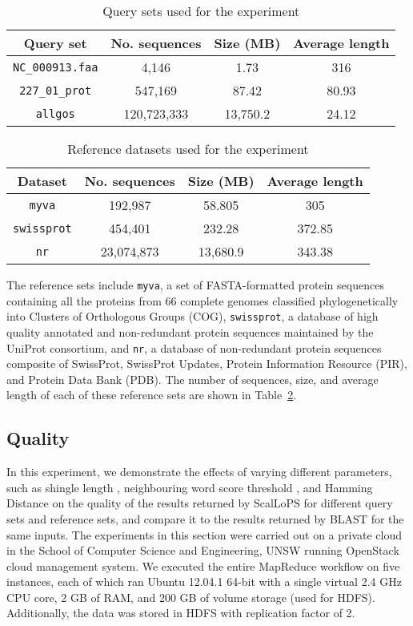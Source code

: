 \documentclass[titlepage]{csetr}
\begin{document}
\begin{table}[t]
\centering
\caption{Query sets used for the experiment}
\label{tbl:Querysets}
\begin{tabular} { | c | c | c | c |}
\hline
Query set & No. sequences & Size (MB) & Average length\\
\hline
\texttt{NC\_000913.faa} & 4,146 & 1.73 & 316\\
\texttt{227\_01\_prot} & 547,169 & 87.42 &  80.93\\
\texttt{allgos} & 120,723,333 & 13,750.2 & 24.12\\
\hline
\end{tabular}
\end{table}

\begin{table}[t]
\centering
\caption{Reference datasets used for the experiment}
\label{tbl:Datasets}
\begin{tabular} {| c | c | c | c | }
\hline
Dataset & No. sequences & Size (MB) & Average length\\
\hline
\texttt{myva} & 192,987 & 58.805 & 305\\
\texttt{swissprot} & 454,401 & 232.28 & 372.85\\
\texttt{nr} & 23,074,873 & 13,680.9 & 343.38\\
\hline
\end{tabular}
\end{table}


The reference sets include \texttt{myva}, a set of FASTA-formatted protein sequences containing all the proteins from 66 complete genomes classified phylogenetically into Clusters of Orthologous Groups (COG), \texttt{swissprot}, a database of high quality annotated and non-redundant protein sequences maintained by the UniProt consortium, and \texttt{nr}, a database of non-redundant protein sequences composite of SwissProt, SwissProt Updates, Protein Information Resource (PIR), and Protein Data Bank (PDB). The number of sequences, size, and  average length of each of these reference sets are shown in Table~\ref{tbl:Datasets}.


\subsection{Quality}
\label{sec:quality}

In this experiment, we demonstrate the effects of varying different parameters, such as shingle length , neighbouring word score threshold , and Hamming Distance  on the quality of the results returned by ScalLoPS for different query sets and reference sets, and compare it to the results returned by BLAST for the same inputs. The experiments in this section were carried out on a private cloud in the School of Computer Science and Engineering, UNSW running OpenStack cloud management system. We executed the entire MapReduce workflow on five instances, each of which ran Ubuntu 12.04.1 64-bit with a single virtual 2.4 GHz CPU core, 2 GB of RAM, and 200 GB of volume storage (used for HDFS). Additionally, the data was stored in HDFS with replication factor of 2.
\end{document}
